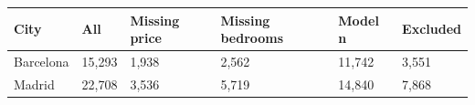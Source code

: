 \begin{tabular}{llllll}
\toprule
City & All & Missing price & Missing bedrooms & Model n & Excluded \\
\midrule
Barcelona & 15,293 & 1,938 & 2,562 & 11,742 & 3,551 \\
Madrid & 22,708 & 3,536 & 5,719 & 14,840 & 7,868 \\
\bottomrule
\end{tabular}

